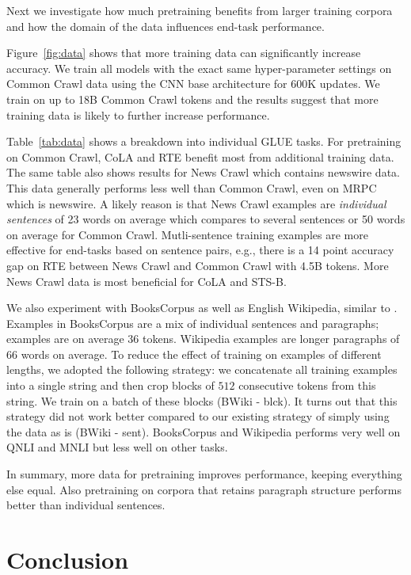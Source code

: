 \documentclass[11pt,a4paper]{article}
\begin{document}
Next we investigate how much pretraining benefits from larger training corpora and how the domain of the data influences end-task performance.

Figure~\ref{fig:data} shows that more training data can significantly increase accuracy. 
We train all models with the exact same hyper-parameter settings on Common Crawl data using the CNN base architecture for 600K updates.
We train on up to 18B Common Crawl tokens and the results suggest that more training data is likely to further increase performance.

Table~\ref{tab:data} shows a breakdown into individual GLUE tasks.
For pretraining on Common Crawl, CoLA and RTE benefit most from additional training data.
The same table also shows results for News Crawl which contains newswire data.
This data generally performs less well than Common Crawl, even on MRPC which is newswire.
A likely reason is that News Crawl examples are \emph{individual sentences} of 23 words on average which compares to several sentences or 50 words on average for Common Crawl.
Mutli-sentence training examples are more effective for end-tasks based on sentence pairs, e.g., there is a 14 point accuracy gap on RTE between News Crawl and Common Crawl with 4.5B tokens.
More News Crawl data is most beneficial for CoLA and STS-B. 

We also experiment with BooksCorpus \citep{zhu2015books} as well as English Wikipedia, similar to \citet{devlin2018bert}. 
Examples in BooksCorpus are a mix of individual sentences and paragraphs; examples are on average 36 tokens.
Wikipedia examples are longer paragraphs of 66 words on average.
To reduce the effect of training on examples of different lengths, we adopted the following strategy: we concatenate all training examples into a single string and then crop blocks of $512$ consecutive tokens from this string. 
We train on a batch of these blocks (BWiki - blck).
It turns out that this strategy did not work better compared to our existing strategy of simply using the data as is (BWiki - sent).
BooksCorpus and Wikipedia performs very well on QNLI and MNLI but less well on other tasks.

In summary, more data for pretraining improves performance, keeping everything else equal. 
Also pretraining on corpora that retains paragraph structure performs better than individual sentences.




\section{Conclusion}
\end{document}
